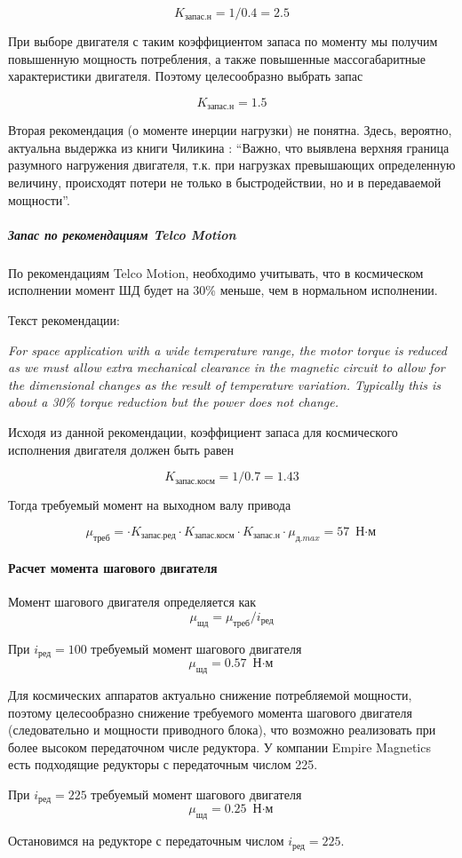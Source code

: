 $$
    K_\textit{запас.н} = 1 / 0.4 = 2.5
$$

При выборе двигателя с таким коэффициентом запаса по моменту мы получим повышенную
мощность потребления, а также повышенные массогабаритные характеристики двигателя.
Поэтому целесообразно выбрать запас

$$
    K_\textit{запас.н} = 1.5
$$

Вторая рекомендация (о моменте инерции нагрузки) не понятна. Здесь, вероятно,
актуальна выдержка из книги Чиликина \cite{Chilikin}: ``Важно, что выявлена верхняя
граница разумного нагружения двигателя, т.к. при нагрузках превышающих определенную
величину, происходят потери не только в быстродействии, но и в передаваемой мощности''.

\subparagraph{Запас по рекомендациям Telco Motion}
По рекомендациям Telco Motion, необходимо учитывать, что в космическом исполнении
момент ШД будет на 30\% меньше, чем в нормальном исполнении.

Текст рекомендации:

\textit{For space application with a wide temperature range, the motor torque is reduced
as we must allow extra mechanical clearance in the magnetic circuit to allow for
the dimensional changes as the result of temperature variation. Typically this
is about a 30\% torque reduction but the power does not change.}

Исходя из данной рекомендации, коэффициент запаса для космического исполнения
двигателя должен быть равен

$$
    K_\textit{запас.косм} = 1 / 0.7 = 1.43
$$

Тогда требуемый момент на выходном валу привода

$$
    \mu_\textit{треб} =
                \cdot K_\textit{запас.ред} \cdot K_\textit{запас.косм}
                \cdot K_\textit{запас.н} \cdot \mu_\textit{д.max}
                = 57 \text{ Н$\cdot$м}
$$

\paragraph{Расчет момента шагового двигателя}

Момент шагового двигателя определяется как
\begin{equation}
    \mu_\textit{шд} = \mu_\textit{треб} / i_\text{ред}
    \label{stepper_engine_torque}
\end{equation}


При $i_\text{ред} = 100$ требуемый момент шагового двигателя
$$
    \mu_\textit{шд} = 0.57 \text{ Н$\cdot$м}
$$

Для космических аппаратов актуально снижение потребляемой мощности, поэтому
целесообразно снижение требуемого момента шагового двигателя
(следовательно и мощности приводного блока), что возможно реализовать при более
высоком передаточном числе редуктора. У компании Empire Magnetics есть подходящие
редукторы с передаточным числом 225.

При $i_\text{ред} = 225$ требуемый момент шагового двигателя
$$
    \mu_\textit{шд} = 0.25 \text{ Н$\cdot$м}
$$

Остановимся на редукторе с передаточным числом $i_\text{ред} = 225$.
